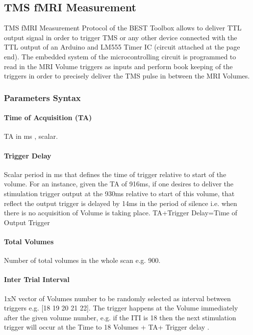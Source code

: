 \documentclass[letterpaper,10pt,english]{sphinxmanual}
\begin{document}
\subsection{TMS fMRI Measurement}
\label{\detokenize{14_TMSfMRIMeasurement:tms-fmri-measurement}}\label{\detokenize{14_TMSfMRIMeasurement::doc}}
\sphinxAtStartPar
TMS fMRI Measurement Protocol of the BEST Toolbox allows to deliver TTL output signal in order to trigger TMS or any other device connected with the TTL output of an Arduino and LM555 Timer IC (circuit attached at the page end). The embedded system of the microcontrolling circuit is programmed to read in the MRI Volume triggers as inputs and perform book keeping of the triggers in order to precisely deliver the TMS pulse in between the MRI Volumes.


\subsubsection{Parameters Syntax}
\label{\detokenize{14_TMSfMRIMeasurement:parameters-syntax}}

\paragraph{Time of Acquisition (TA)}
\label{\detokenize{14_TMSfMRIMeasurement:time-of-acquisition-ta}}
\sphinxAtStartPar
TA in ms , scalar.


\paragraph{Trigger Delay}
\label{\detokenize{14_TMSfMRIMeasurement:trigger-delay}}
\sphinxAtStartPar
Scalar period in ms that defines the time of trigger relative to start of the volume. For an instance, given the TA of 916ms, if one desires to deliver the stimulation trigger output at the 930ms relative to start of this volume, that reflect the output trigger is delayed by 14ms in the period of silence i.e. when there is no acquisition of Volume is taking place. TA+Trigger Delay=Time of Output Trigger


\paragraph{Total Volumes}
\label{\detokenize{14_TMSfMRIMeasurement:total-volumes}}
\sphinxAtStartPar
Number of total volumes in the whole scan e.g. 900.


\paragraph{Inter Trial Interval}
\label{\detokenize{14_TMSfMRIMeasurement:inter-trial-interval}}
\sphinxAtStartPar
1xN vector of Volumes number to be randomly selected as interval between triggers e.g. {[}18 19 20 21 22{]}. The trigger happens at the Volume immediately after the given volume number, e.g. if the ITI is 18 then the next stimulation trigger will occur at the Time to 18 Volumes + TA+ Trigger delay .
\end{document}

